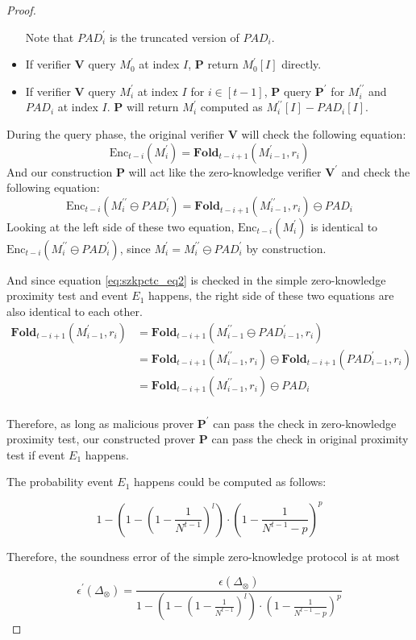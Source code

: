\begin{proof}
\begin{itemize}
    Note that $PAD_i^\prime$ is the truncated version of $PAD_i$.
    \item If verifier \textbf{V} query $M_0^\prime$ at index $I$, \textbf{P} return $M_0^\prime[I]$ directly.
    
    \item If verifier \textbf{V} query $M_i^\prime$ at index $I$ for $i \in [t-1]$, \textbf{P} query $\textbf{P}^\prime$ for $M_i^{\prime\prime}$ and $PAD_i$ at index $I$. \textbf{P} will return $M_i^\prime$ computed as $M_i^{\prime\prime}[I] - PAD_i[I]$.
\end{itemize}

During the query phase, the original verifier \textbf{V} will check the following equation:
$$
    \text{Enc}_{t-i}(M_i^\prime) = \textbf{Fold}_{t-i+1}(M_{i-1}^\prime, r_i)
$$
And our construction \textbf{P} will act like the zero-knowledge verifier $\textbf{V}^\prime$ and check the following equation:
$$
    \text{Enc}_{t-i}(M_i^{\prime\prime} \ominus PAD_{i}^\prime) = \textbf{Fold}_{t-i+1}(M_{i-1}^{\prime\prime}, r_i) \ominus PAD_i
$$
Looking at the left side of these two equation, $\text{Enc}_{t-i}(M_i^\prime)$ is identical to $\text{Enc}_{t-i}(M_i^{\prime\prime} \ominus PAD_{i}^\prime)$, since $M_i^\prime = M_i^{\prime\prime} \ominus PAD_{i}^\prime$ by construction.

And since equation \ref{eq:szkpctc_eq2} is checked in the simple zero-knowledge proximity test and event $E_1$ happens, the right side of these two equations are also identical to each other.
\begin{align}
\textbf{Fold}_{t-i+1}(M_{i-1}^\prime, r_i) 
&= \textbf{Fold}_{t-i+1}(M_{i-1}^{\prime\prime} \ominus PAD_{i-1}^\prime, r_i) \nonumber \\
&= \textbf{Fold}_{t-i+1}(M_{i-1}^{\prime\prime}, r_i) \ominus \textbf{Fold}_{t-i+1}(PAD_{i-1}^\prime, r_i) \nonumber \\
&= \textbf{Fold}_{t-i+1}(M_{i-1}^{\prime\prime}, r_i) \ominus PAD_i \nonumber \\
\end{align}

Therefore, as long as malicious prover $\textbf{P}^\prime$ can pass the check in zero-knowledge proximity test, our constructed prover \textbf{P} can pass the check in original proximity test if event $E_1$ happens.

The probability event $E_1$ happens could be computed as follows:

$$
    1 - (1 - (1 - \frac{1}{N^{t-1}})^l) \cdot (1 - \frac{1}{N^{t-1} - p})^p 
$$

Therefore, the soundness error of the simple zero-knowledge protocol is at most

$$
    \epsilon^\prime(\Delta_\otimes) = 
    \frac{ \epsilon(\Delta_\otimes)}{1 - (1 - (1 - \frac{1}{N^{t-1}})^l) \cdot (1 - \frac{1}{N^{t-1} - p})^p }
$$

\end{proof}



